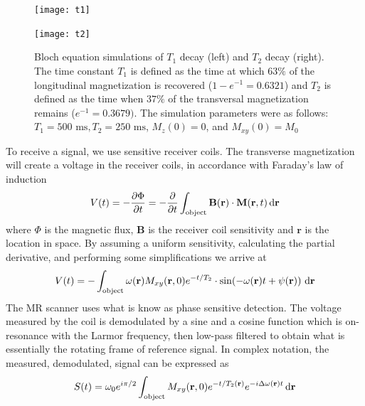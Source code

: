 \begin{figure}[hbtp]
    \begin{subfloat}
        \centering
        \texttt{[image: t1]}
    \end{subfloat}
    \begin{subfloat}
        \centering
        \texttt{[image: t2]}
    \end{subfloat}
    \caption{Bloch equation simulations of $T_1$ decay (left) and $T_2$ decay (right). The time constant $T_1$ is defined as the time at which $63\%$ of the longitudinal magnetization is recovered ($1-e^{-1} = 0.6321$) and $T_2$ is defined as the time when $37\%$ of the transversal magnetization remains ($e^{-1} = 0.3679)$. The simulation parameters were as follows: $T_1 = 500\textrm{ ms}, T_2 = 250\textrm{ ms}$, $M_z(0) = 0$, and $M_{xy}(0) = M_0$ }
    \label{fig:relaxation}
\end{figure}
To receive a signal, we use sensitive receiver coils. The transverse magnetization will create a voltage in the receiver coils, in accordance with Faraday's law of induction
\begin{equation}
    V(t) = -\frac{\partial \Phi}{\partial t} = -\frac{\partial}{\partial t}\int_{\textrm{object}} \textbf{B}(\textbf{r})\cdot\textbf{M}(\textbf{r},t) \dif \textbf{r}
\end{equation}
where $\Phi$ is the magnetic flux, $\textbf{B}$ is the receiver coil sensitivity and $\textbf{r}$ is the location in space. By assuming a uniform sensitivity, calculating the partial derivative, and performing some simplifications we arrive at
\begin{equation}
    V(t) = -\int_{\textrm{object}} \omega(\textbf{r})M_{xy}(\textbf{r},0)e^{-t/T_2}\cdot\sin(-\omega(\textbf{r})t + \psi(\textbf{r}))\,\dif\textbf{r}
\end{equation}
The MR scanner uses what is know as phase sensitive detection. The voltage measured by the coil is demodulated by a sine and a cosine function which is on-resonance with the Larmor frequency, then low-pass filtered to obtain what is essentially the rotating frame of reference signal. In complex notation, the measured, demodulated, signal can be expressed as
\begin{equation}
    S(t) = \omega_0e^{i\pi/2}\int_{\textrm{object}}M_{xy}(\textbf{r},0)e^{-t/T_2(\textbf{r})}e^{-i\Delta \omega(\textbf{r})t}\dif \textbf{r}
    \label{eq:signal}
\end{equation}



